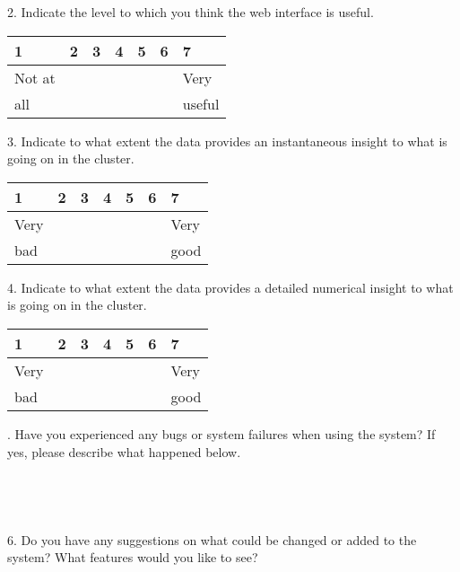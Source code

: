 \documentclass[12pt]{article}
\begin{document}
2. Indicate the level to which you think the web interface is useful.
\vspace{-4ex}
\begin{center}
\begin{tabular}{
|m{4em}|m{4em}|m{4em}|m{4em}|m{4em}|m{4em}|m{4em}| }
\hline
 1 & 2 & 3 & 4 & 5 & 6 & 7 \\ 
 \hline
 Not at &&&&&& Very\\
 all &&&&&& useful\\
  \hline
\end{tabular}
\end{center}

3. Indicate to what extent the data provides an instantaneous insight to what is going on in the cluster.
\vspace{-4ex}
\begin{center}
\begin{tabular}{
|m{4em}|m{4em}|m{4em}|m{4em}|m{4em}|m{4em}|m{4em}| }
\hline
 1 & 2 & 3 & 4 & 5 & 6 & 7 \\ 
 \hline
 Very &&&&&& Very\\
 bad &&&&&& good\\
  \hline
\end{tabular}
\end{center}

4. Indicate to what extent the data provides a detailed numerical insight to what is going on in the cluster.
\vspace{-4ex}
\begin{center}
\begin{tabular}{
|m{4em}|m{4em}|m{4em}|m{4em}|m{4em}|m{4em}|m{4em}| }
\hline
 1 & 2 & 3 & 4 & 5 & 6 & 7 \\ 
 \hline
 Very &&&&&& Very\\
 bad &&&&&& good\\
  \hline
\end{tabular}
\end{center}
. Have you experienced any bugs or system failures when using the system? If yes, please describe what happened below.\\\\\\\\\\

6. Do you have any suggestions on what could be changed or added to the system? What features would you like to see?\\\\\\\\\\
\end{document}
